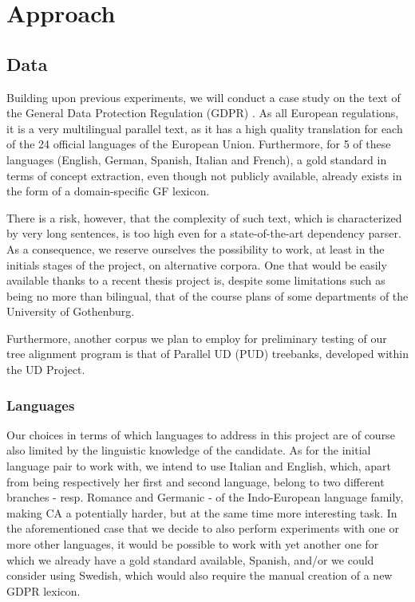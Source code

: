 \documentclass{article}
\begin{document}
\section{Approach}
\subsection{Data}
Building upon previous experiments, we will conduct a case study on the text of the General Data Protection Regulation (GDPR) \cite{gdpr}.
As all European regulations, it is a very multilingual parallel text, as it has a high quality translation for each of the 24 official languages of the European Union.
Furthermore, for 5 of these languages (English, German, Spanish, Italian and French), a gold standard in terms of concept extraction, even though not publicly available, already exists in the form of a domain-specific GF lexicon.

There is a risk, however, that the complexity of such text, which is characterized by very long sentences, is too high even for a state-of-the-art dependency parser. As a consequence, we reserve ourselves the possibility to work, at least in the initials stages of the project, on alternative corpora.
One that would be easily available thanks to a recent thesis project is, despite some limitations such as being no more than bilingual, that of the course plans of some departments of the University of Gothenburg. %

Furthermore, another corpus we plan to employ for preliminary testing of our tree alignment program is that of Parallel UD (PUD) treebanks, developed within the UD Project. %

\subsubsection{Languages}
Our choices in terms of which languages to address in this project are of course also limited by the linguistic knowledge of the candidate.
As for the initial language pair to work with, we intend to use Italian and English, which, apart from being respectively her first and second language, belong to two different branches - resp. Romance and Germanic - of the Indo-European language family, making CA a potentially harder, but at the same time more interesting task.
In the aforementioned case that we decide to also perform experiments with one or more other languages, it would be possible to work with yet another one for which we already have a gold standard available, Spanish, and/or we could consider using Swedish, which would also require the manual creation of a new GDPR lexicon. %
\end{document}

